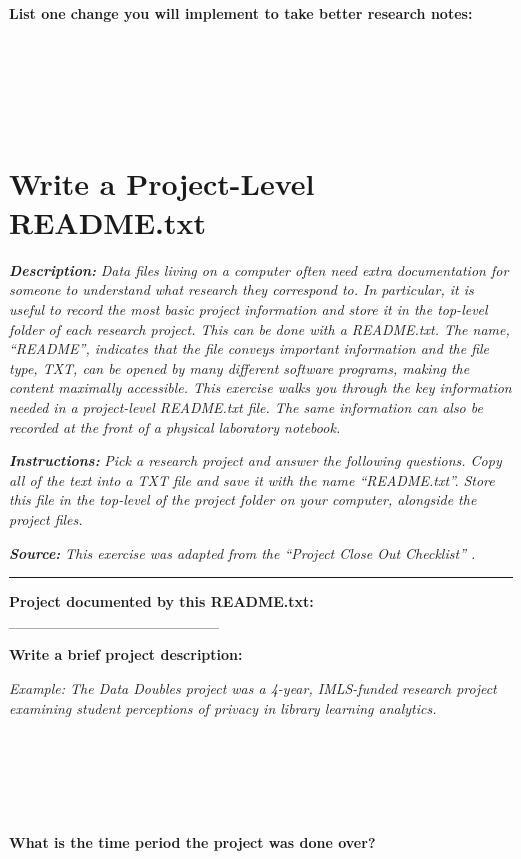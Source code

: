 \documentclass[
]{book}
\begin{document}
~

~

\textbf{List one change you will implement to take better research notes:}

~

~

~

\hypertarget{readme-txt}{%
\section{Write a Project-Level README.txt}\label{readme-txt}}

\textbf{\emph{Description:}} \emph{Data files living on a computer often need extra documentation for someone to understand what research they correspond to. In particular, it is useful to record the most basic project information and store it in the top-level folder of each research project. This can be done with a README.txt. The name, ``README'', indicates that the file conveys important information and the file type, TXT, can be opened by many different software programs, making the content maximally accessible. This exercise walks you through the key information needed in a project-level README.txt file. The same information can also be recorded at the front of a physical laboratory notebook.}

\textbf{\emph{Instructions:}} \emph{Pick a research project and answer the following questions. Copy all of the text into a TXT file and save it with the name ``README.txt''. Store this file in the top-level of the project folder on your computer, alongside the project files.}

\textbf{\emph{Source:}} \emph{This exercise was adapted from the ``Project Close Out Checklist'' \citep{briney_project_2020}.}

\begin{center}\rule{0.5\linewidth}{0.5pt}\end{center}

\textbf{Project documented by this README.txt:} \_\_\_\_\_\_\_\_\_\_\_\_\_\_\_\_\_\_\_\_

\textbf{Write a brief project description:}

\emph{Example: The Data Doubles project was a 4-year, IMLS-funded research project examining student perceptions of privacy in library learning analytics.}

~

~

~

\textbf{What is the time period the project was done over?}
\end{document}
